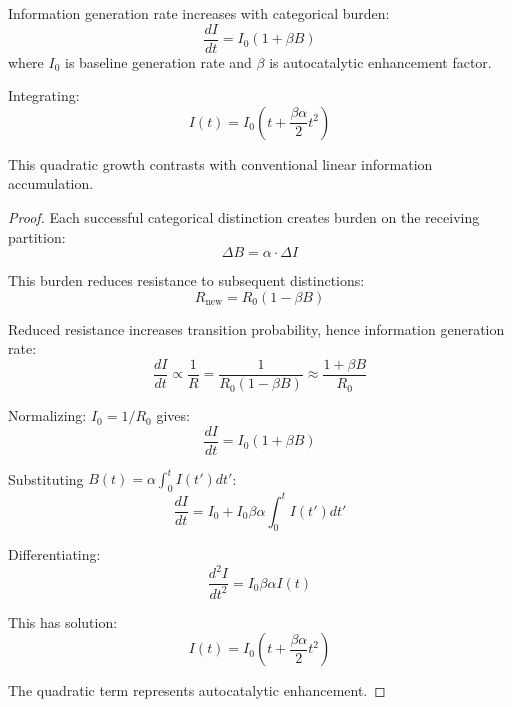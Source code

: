 \begin{theorem}
\label{thm:autocatalytic}
Information generation rate increases with categorical burden:
\begin{equation}
\frac{dI}{dt} = I_0 \left(1 + \beta B\right)
\end{equation}
where $I_0$ is baseline generation rate and $\beta$ is autocatalytic enhancement factor.

Integrating:
\begin{equation}
I(t) = I_0 \left(t + \frac{\beta\alpha}{2} t^2\right)
\end{equation}

This quadratic growth contrasts with conventional linear information accumulation.
\end{theorem}

\begin{proof}
Each successful categorical distinction creates burden on the receiving partition:
\begin{equation}
\Delta B = \alpha \cdot \Delta I
\end{equation}

This burden reduces resistance to subsequent distinctions:
\begin{equation}
R_{\text{new}} = R_0 (1 - \beta B)
\end{equation}

Reduced resistance increases transition probability, hence information generation rate:
\begin{equation}
\frac{dI}{dt} \propto \frac{1}{R} = \frac{1}{R_0(1-\beta B)} \approx \frac{1 + \beta B}{R_0}
\end{equation}

Normalizing: $I_0 = 1/R_0$ gives:
\begin{equation}
\frac{dI}{dt} = I_0(1 + \beta B)
\end{equation}

Substituting $B(t) = \alpha \int_0^t I(t') dt'$:
\begin{equation}
\frac{dI}{dt} = I_0 + I_0\beta\alpha \int_0^t I(t') dt'
\end{equation}

Differentiating:
\begin{equation}
\frac{d^2I}{dt^2} = I_0\beta\alpha I(t)
\end{equation}

This has solution:
\begin{equation}
I(t) = I_0(t + \frac{\beta\alpha}{2}t^2)
\end{equation}

The quadratic term represents autocatalytic enhancement.
\end{proof}

